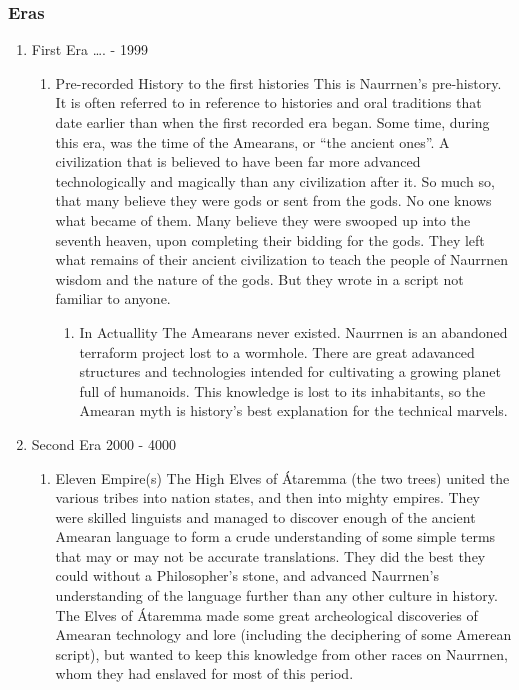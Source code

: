 \documentclass[11pt]{article}
\begin{document}
\subsubsection{Eras}
\label{sec:org923da7d}
\begin{enumerate}
\item First Era \ldots{}. -  1999
\label{sec:org4cd5d49}
\begin{enumerate}
\item Pre-recorded History to the first histories
\label{sec:org073a57e}
This is Naurrnen's pre-history. It is often referred to in reference to histories and oral traditions that date earlier than when the first recorded era began. Some time, during this era, was the time of the Amearans, or ``the ancient ones''. A civilization that is believed to have been far more advanced technologically and magically than any civilization after it. So much so, that many believe they were gods or sent from the gods. No one knows what became of them. Many believe they were swooped up into the seventh heaven, upon completing their bidding for the gods. They left what remains of their ancient civilization to teach the people of Naurrnen wisdom and the nature of the gods. But they wrote in a script not familiar to anyone.
\begin{enumerate}
\item In Actuallity
\label{sec:org65be669}
The Amearans never existed. Naurrnen is an abandoned terraform project lost to a wormhole. There are great adavanced structures and technologies intended for cultivating a growing planet full of humanoids. This knowledge is lost to its inhabitants, so the Amearan myth is history's best explanation for the technical marvels.
\end{enumerate}
\end{enumerate}
\item Second Era 2000 - 4000
\label{sec:org30920b2}
\begin{enumerate}
\item Eleven Empire(s)
\label{sec:orgb268bd5}
The High Elves of Átaremma (the two trees) united the various tribes into nation states, and then into mighty empires. They were skilled linguists and managed to discover enough of the ancient Amearan language to form a crude understanding of some simple terms that may or may not be accurate translations. They did the best they could without a Philosopher's stone, and advanced Naurrnen's understanding of the language further than any other culture in history.
The Elves of Átaremma made some great archeological discoveries of Amearan technology and lore (including the deciphering of some Amerean script), but wanted to keep this knowledge from other races on Naurrnen, whom they had enslaved for most of this period.

\end{enumerate}
\end{enumerate}
\end{document}
